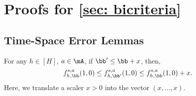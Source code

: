 \documentclass[pdftex, a4paper, 12pt]{article}
\begin{document}
\section{Proofs for \texorpdfstring{\cref{sec: bicriteria}}{sec: bicriteria}}

\subsection{Time-Space Error Lemmas}

\begin{lemma}\label{lem: time-error}
    For any $h \in [H]$, $a \in \mA$, if $\bb' \leq \bb + x$, then,
    \begin{equation}
        f_{h,\bb}^{s,a}(1, 0) \leq f_{h,\bb'}^{s,a}(1, 0) \leq f_{h,\bb}^{s,a}(1, 0) + x.
    \end{equation}
    Here, we translate a scaler $x > 0$ into the vector $(x,\ldots, x)$.
\end{lemma}
\end{document}
